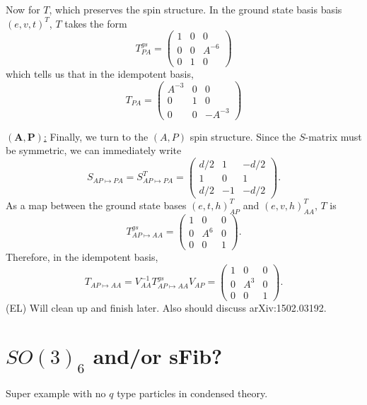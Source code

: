 \documentclass[12pt,a4paper]{article}
\newcommand\be            {\begin{equation}}
\newcommand\ee            {\end{equation}}
\newcommand{\ethan}[1]{{\color{amethyst}\footnotesize{(EL) #1}}}
\begin{document}
Now for $T$, which preserves the spin structure. In the ground state basis basis $(e,v,t)^T$, $T$ takes the form 
\be T^{gs}_{PA} = \begin{pmatrix}
1 & 0 & 0\\ 0 & 0 & A^{-6} \\ 0&1&0 
\end{pmatrix}\ee
which tells us that in the idempotent basis, 
\be T_{PA}  = \begin{pmatrix}
A^{-3} & 0 & 0 \\ 0 & 1 & 0 \\ 0 & 0 & -A^{-3}
\end{pmatrix}\ee

\underline{$\mathbf{(A,P)}$:} Finally, we turn to the $(A,P)$ spin structure. 
Since the $S$-matrix must be symmetric, we can immediately write 
\be S_{AP \mapsto PA} =  S_{AP \mapsto PA}^T = \begin{pmatrix}
d/2 & 1 & -d/2 \\ 1 & 0 & 1 \\ d/2 & -1 & -d/2
\end{pmatrix}.\ee
As a map between the ground state bases $(e,t,h)^T_{AP}$ and $(e,v,h)^T_{AA}$, $T$ is 
\be T^{gs}_{AP \mapsto AA} = \begin{pmatrix}
1 &0&0 \\ 0&A^6 &0\\0&0&1
\end{pmatrix}.\ee
Therefore, in the idempotent basis, 
\be T_{AP\mapsto AA} = V_{AA}^{-1} T^{gs}_{AP\mapsto AA} V_{AP} = \begin{pmatrix}
1 &0&0 \\ 0&A^3&0\\0&0&1
\end{pmatrix}.\ee
\ethan{Will clean up and finish later. Also should discuss arXiv:1502.03192}. 

\section{$SO(3)_6$ and/or sFib?}
Super example with no $q$ type particles in condensed theory.
\end{document}
